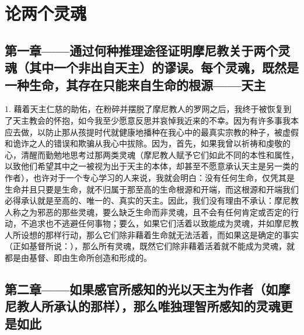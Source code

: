 
\chapter{论两个灵魂}


\par


\section{第一章——通过何种推理途径证明摩尼教关于两个灵魂（其中一个非出自天主）的谬误。每个灵魂，既然是一种生命，其存在只能来自生命的根源——天主}

1. 藉着天主仁慈的助佑，在粉碎并摆脱了摩尼教人的罗网之后，我终于被恢复到了天主教会的怀抱，如今我至少愿意反思并哀悼我近来的不幸。因为有许多事我本应去做，以防止那从孩提时代就健康地播种在我心中的最真实宗教的种子，被虚假和诡诈之人的错误和欺骗从我心中拔除。因为，首先，如果我曾以祈祷和虔敬的心，清醒而勤勉地思考过那两类灵魂（摩尼教人赋予它们如此不同的本性和属性，以致他们希望其中之一被视为出于天主的本体，却甚至不愿意承认天主是另一类的作者），也许对于一个专心学习的人来说，我就会明白：没有任何生命，仅凭其是生命并且只要是生命，就不归属于那至高的生命根源和开端，而这根源和开端我们必得承认就是至高的、唯一的、真实的天主。因此，我们没有理由不承认：摩尼教人称之为邪恶的那些灵魂，要么缺乏生命而非灵魂，且不会有任何肯定或否定的行动，不追求也不逃避任何事物；要么，如果它们活着以致能成为灵魂，并如摩尼教人所设想的那样行动，那么它们除非藉着生命就无法活着，而如果这是确定的事实（正如基督所说：），那么所有灵魂，既然它们除非藉着活着就不能成为灵魂，就都是由基督、即由生命所创造和形成的。\par


\section{第二章——如果感官所感知的光以天主为作者（如摩尼教人所承认的那样），那么唯独理智所感知的灵魂更是如此}

